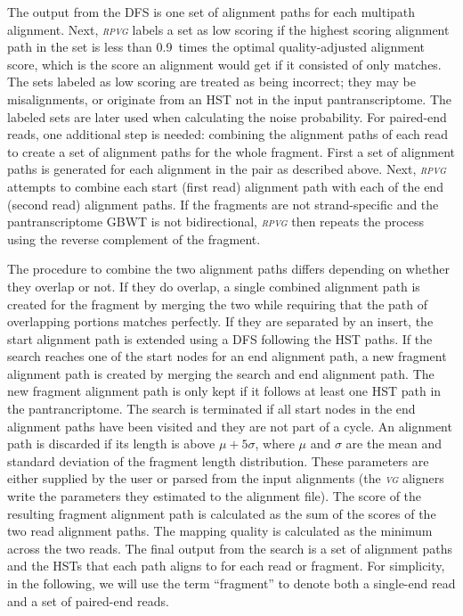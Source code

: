 \documentclass[11pt]{ucthesis}
\newcommand{\tool}[1]{\emph{\textsc{#1}}}
\begin{document}
The output from the DFS is one set of alignment paths for each multipath alignment. Next, \tool{rpvg} labels a set as low scoring if the highest scoring alignment path in the set is less than 0.9~times the optimal quality-adjusted alignment score, which is the score an alignment would get if it consisted of only matches. The sets labeled as low scoring are treated as being incorrect; they may be misalignments, or originate from an HST not in the input pantranscriptome. The labeled sets are later used when calculating the noise probability. 
\newline 
\newline
For paired-end reads, one additional step is needed: combining the alignment paths of each read to create a set of alignment paths for the whole fragment. First a set of alignment paths is generated for each alignment in the pair as described above. Next, \tool{rpvg} attempts to combine each start (first read) alignment path with each of the end (second read) alignment paths. If the fragments are not strand-specific and the pantranscriptome GBWT is not bidirectional, \tool{rpvg} then repeats the process using the reverse complement of the fragment. 

The procedure to combine the two alignment paths differs depending on whether they overlap or not. If they do overlap, a single combined alignment path is created for the fragment by merging the two while requiring that the path of overlapping portions matches perfectly. If they are separated by an insert, the start alignment path is extended using a DFS following the HST paths. If the search reaches one of the start nodes for an end alignment path, a new fragment alignment path is created by merging the search and end alignment path. The new fragment alignment path is only kept if it follows at least one HST path in the pantrancriptome. The search is terminated if all start nodes in the end alignment paths have been visited and they are not part of a cycle. An alignment path is discarded if its length is above ${\mu + 5\sigma}$, where $\mu$ and $\sigma$ are the mean and standard deviation of the fragment length distribution. These parameters are either supplied by the user or parsed from the input alignments (the \tool{vg} aligners write the parameters they estimated to the alignment file). The score of the resulting fragment alignment path is calculated as the sum of the scores of the two read alignment paths. The mapping quality is calculated as the minimum across the two reads. 
 \newline 
\newline
The final output from the search is a set of alignment paths and the HSTs that each path aligns to for each read or fragment. For simplicity, in the following, we will use the term ``fragment'' to denote both a single-end read and a set of paired-end reads.
\end{document}
